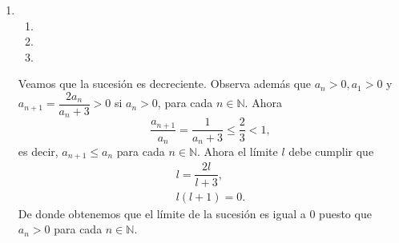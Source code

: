 \begin{enumerate}[label=\color{red}\textbf{\arabic*)}, leftmargin=*]
	Observamos que $x_{n+1}=\dfrac{1}{7}x_n^3+\dfrac{6}{7}$. Demostramos por inducción que la sucesión es monótona creciente. Efectivamente, $x_2=\dfrac{7}{8}>x_1=\dfrac{1}{2}$. Además podemos afirmar que $x_n\ge0$ para cada $n\in\mathbb{N}$. Supongamos que $x_n\ge x_{n-1}$. De aquí, $x_{n+1}=\dfrac{x_n^3+6}{7}\le\dfrac{x_{n-1}^3+6}{7}=x_n$. Por otra parte tenemos que la desigualdad $x_{n+1}\ge x_n$ se cumple si y sólo si $x^3-7x_n+6\ge0$, es decir, $(x_n-1)(x_n-2)(x_n+3)\ge0$. Desigualdad, ésta última, que se cumple cuando $x_n\in[-3,1]\cup[2,+\infty)$. Vamos a demostrar por inducción que la sucesión está acotada por 1. Trivialmente, $x_1=\dfrac{1}{2}\le1$. Si $x_n\le1$ entonces \[ x_{n+1}=\dfrac{x_n^3+6}{7}\le\dfrac{1^3+6}{7}=1, \] por lo que la acotación está demostrada. Por último, podemos que el límite de la sucesión será 1. Basta con tomar límites en ambos términos de la expresión $x_{n+1}=\dfrac{x_n^3+6}{7}$ para obtener que la única solución posible es 1.
	
	Si $x_1=\dfrac{3}{2}$, veremos que en este caso la sucesión es decreciente. \[ x_2=\dfrac{75}{56}<\dfrac{3}{2}. \] Si $x_n\le x_{n-1}$ entonces $x_{n+1}=\dfrac{x_n^3+6}{7}\le\dfrac{x_{n-1}^3+6}{7}=x_n$. Ahora siguiendo con razonamiento similar podemos demostrar que $x_n\ge1$ para cada $n\in\mathbb{N}$. $x_1\le1$. Supongamos que $x_n\ge1$ entonces $x_{n+1}=\dfrac{x_n^3+6}{7}\ge\dfrac{1+6}{7}=1$. De nuevo concluimos que la sucesión es convergente y que el límite es igual a 1. 
	\item {}
	\begin{enumerate}[label=\color{red}\roman*)]
		\item {}
		\item {}
		\item {}
	\end{enumerate}
	
	Veamos que la sucesión es decreciente. Observa además que $a_n>0,a_1>0$ y $a_{n+1}=\dfrac{2a_n}{a_n+3}>0$ si $a_n>0$, para cada $n\in\mathbb{N}$. Ahora \[ \dfrac{a_{n+1}}{a_n}=\dfrac{1}{a_n+3}\le\dfrac{2}{3}<1, \] es decir, $a_{n+1}\le a_n$ para cada $n\in\mathbb{N}$. Ahora el límite $l$ debe cumplir que \[ \begin{array}{c}
		l=\dfrac{2l}{l+3},\\
		l(l+1)=0.
	\end{array} \]De donde obtenemos que el límite de la sucesión es igual a 0 puesto que $a_n>0$ para cada $n\in\mathbb{N}$.
	

\end{enumerate}
